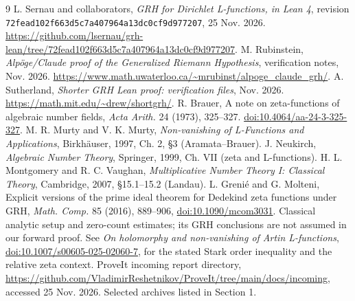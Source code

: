 \documentclass[11pt]{article}
\theoremstyle{remark}\newtheorem{remark}[theorem]{Remark}
\begin{document}
\begin{thebibliography}{9}
 L. Sernau and collaborators, \emph{GRH for Dirichlet L-functions, in Lean 4}, revision \nolinkurl{72fead102f663d5c7a407964a13dc0cf9d977207}, 25 Nov. 2026. \url{https://github.com/lsernau/grh-lean/tree/72fead102f663d5c7a407964a13dc0cf9d977207}.
 M. Rubinstein, \emph{Alp\"oge/Claude proof of the Generalized Riemann Hypothesis}, verification notes, Nov. 2026. \url{https://www.math.uwaterloo.ca/~mrubinst/alpoge_claude_grh/}.
 A. Sutherland, \emph{Shorter GRH Lean proof: verification files}, Nov. 2026. \url{https://math.mit.edu/~drew/shortgrh/}.
 R. Brauer, A note on zeta-functions of algebraic number fields, \emph{Acta Arith.} 24 (1973), 325--327. \href{https://doi.org/10.4064/aa-24-3-325-327}{doi:10.4064/aa-24-3-325-327}.
 M. R. Murty and V. K. Murty, \emph{Non-vanishing of L-Functions and Applications}, Birkh\"auser, 1997, Ch. 2, \S3 (Aramata--Brauer).
 J. Neukirch, \emph{Algebraic Number Theory}, Springer, 1999, Ch. VII (zeta and L-functions).
 H. L. Montgomery and R. C. Vaughan, \emph{Multiplicative Number Theory I: Classical Theory}, Cambridge, 2007, \S15.1--15.2 (Landau).
 L. Greni\'e and G. Molteni, Explicit versions of the prime ideal theorem for Dedekind zeta functions under GRH, \emph{Math. Comp.} 85 (2016), 889--906, \href{https://doi.org/10.1090/mcom3031}{doi:10.1090/mcom3031}. Classical analytic setup and zero-count estimates; its GRH conclusions are not assumed in our forward proof.
 See \emph{On holomorphy and non-vanishing of Artin L-functions}, \href{https://doi.org/10.1007/s00605-025-02060-7}{doi:10.1007/s00605-025-02060-7}, for the stated Stark order inequality and the relative zeta context.
 ProveIt incoming report directory, \url{https://github.com/VladimirReshetnikov/ProveIt/tree/main/docs/incoming}, accessed 25 Nov. 2026. Selected archives listed in Section 1.
\end{thebibliography}
\end{document}
